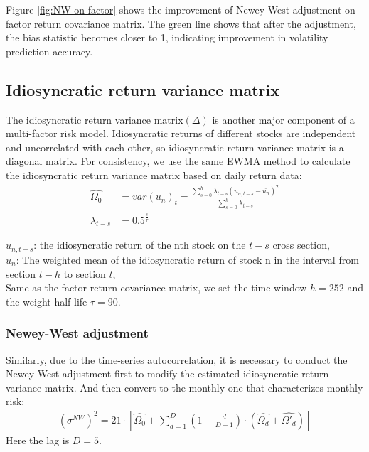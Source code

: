 \documentclass[10pt]{article}
\begin{document}
Figure \ref{fig:NW on factor} shows the improvement of Newey-West adjustment on factor return covariance matrix. The green line shows that after the adjustment, the bias statistic becomes closer to 1, indicating improvement in volatility prediction accuracy.

\subsection{Idiosyncratic return variance matrix}
The idiosyncratic return variance matrix$(\Delta)$ is another major component of a multi-factor risk model. Idiosyncratic returns of different stocks are independent and uncorrelated with each other, so idiosyncratic return variance matrix is a diagonal matrix. For consistency, we use the same EWMA method to calculate the idiosyncratic return variance matrix based on daily return data:
\begin{align}
    \hat{\Omega_0} &=var(u_n)_t = \frac{\sum^h_{s=0}  \lambda_{t-s}(u_{n,t-s}-\bar{u_n})^2 }{ \sum_{s=0}^h \lambda_{t-s}}\\
    \lambda_{t-s} &=0.5^{\frac{s}{\tau}} 
\end{align}

$u_{n,t-s}$: the idiosyncratic return of the nth stock on the $t-s$ cross section,\\
$u_n$: The weighted mean of the idiosyncratic return of stock n in the interval from section $t-h$ to section $t$,\\
Same as the factor return covariance matrix, we set the time window $h = 252$ and the weight half-life $\tau = 90$.\\

\subsubsection{Newey-West adjustment}
Similarly, due to the time-series autocorrelation, it is necessary to conduct the Newey-West adjustment first to modify the estimated idiosyncratic return variance matrix. And then convert to the monthly one that characterizes monthly risk:
\begin{align}
    (\sigma^{NW})^2=21 \cdot [\hat{\Omega_0}+\sum^D_{d=1}(1-\frac{d}{D+1}) \cdot(\hat{\Omega_d}+\hat{\Omega'_d})]
\end{align}
Here the lag is $D = 5$.
\end{document}
